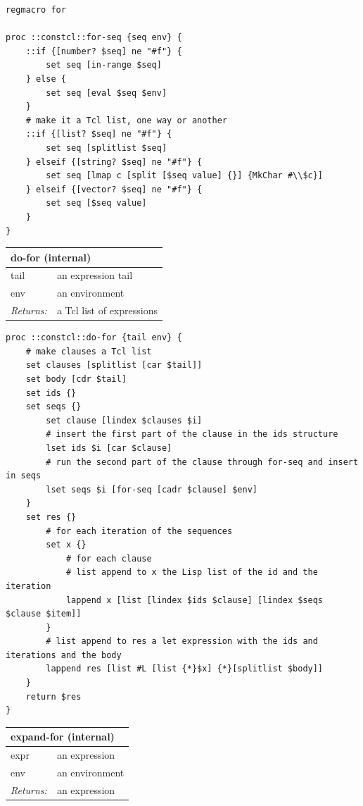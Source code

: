 \documentclass[twoside,9pt]{report}
\begin{document}
\noindent\makebox[\linewidth]{\rule{\linewidth}{0.4pt}}
\begin{lstlisting}
regmacro for
 
proc ::constcl::for-seq {seq env} {
    ::if {[number? $seq] ne "#f"} {
        set seq [in-range $seq]
    } else {
        set seq [eval $seq $env]
    }
    # make it a Tcl list, one way or another
    ::if {[list? $seq] ne "#f"} {
        set seq [splitlist $seq]
    } elseif {[string? $seq] ne "#f"} { 
        set seq [lmap c [split [$seq value] {}] {MkChar #\\$c}]
    } elseif {[vector? $seq] ne "#f"} {
        set seq [$seq value]
    }
}
\end{lstlisting}
\noindent\makebox[\linewidth]{\rule{\linewidth}{0.4pt}}
\begin{tabular}{ |l l| }
\hline
\multicolumn{2}{|l|}{do-for (internal)} \\
\hline
tail & an expression tail \\
env & an environment \\
\textit{Returns:} & a Tcl list of expressions \\
\hline
\end{tabular}

\noindent\makebox[\linewidth]{\rule{\linewidth}{0.4pt}}
\begin{lstlisting}
proc ::constcl::do-for {tail env} {
    # make clauses a Tcl list
    set clauses [splitlist [car $tail]]
    set body [cdr $tail]
    set ids {}
    set seqs {}
        set clause [lindex $clauses $i]
        # insert the first part of the clause in the ids structure
        lset ids $i [car $clause]
        # run the second part of the clause through for-seq and insert in seqs
        lset seqs $i [for-seq [cadr $clause] $env]
    }
    set res {}
        # for each iteration of the sequences
        set x {}
            # for each clause
            # list append to x the Lisp list of the id and the iteration
            lappend x [list [lindex $ids $clause] [lindex $seqs $clause $item]]
        }
        # list append to res a let expression with the ids and iterations and the body
        lappend res [list #L [list {*}$x] {*}[splitlist $body]]
    }
    return $res
}
\end{lstlisting}
\noindent\makebox[\linewidth]{\rule{\linewidth}{0.4pt}}
\begin{tabular}{ |l l| }
\hline
\multicolumn{2}{|l|}{expand-for (internal)} \\
\hline
expr & an expression \\
env & an environment \\
\textit{Returns:} & an expression \\
\hline
\end{tabular}
\end{document}
